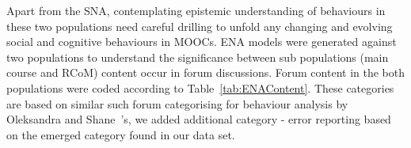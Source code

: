 \documentclass[format=acmsmall, review=false, screen=true]{acmart}
\begin{document}


Apart from the SNA, contemplating epistemic understanding of behaviours in these two populations need careful drilling to unfold any changing and evolving social and cognitive behaviours in MOOCs. ENA models were generated against two populations to understand the significance between sub populations (main course and RCoM) content occur in forum discussions. Forum content in the both populations were coded according to  Table~\ref{tab:ENAContent}. These categories are based on similar such forum categorising for behaviour analysis by Oleksandra and Shane~\cite{oleksandra2016untangling}'s, we added additional category - error reporting  based on the emerged category found in our data set. 
 
\end{document}
